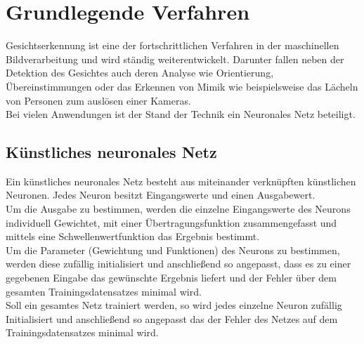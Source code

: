 \section{Grundlegende Verfahren}
Gesichtserkennung ist eine der fortschrittlichen Verfahren in der maschinellen Bildverarbeitung und wird ständig weiterentwickelt. Darunter fallen neben der Detektion des Gesichtes auch deren Analyse wie Orientierung, Übereinstimmungen oder das Erkennen von Mimik wie beispielsweise das Lächeln von Personen zum auslösen einer Kameras.\\
Bei vielen Anwendungen ist der Stand der Technik ein Neuronales Netz beteiligt.
\subsection{Künstliches neuronales Netz}
Ein künstliches neuronales Netz besteht aus miteinander verknüpften künstlichen Neuronen. Jedes Neuron besitzt Eingangswerte und einen Ausgabewert.\\
Um die Ausgabe zu bestimmen, werden die einzelne Eingangswerte des Neurons individuell Gewichtet, mit einer Übertragungsfunktion zusammengefasst und mittels eine Schwellenwertfunktion das Ergebnis bestimmt.\\
Um die Parameter (Gewichtung und Funktionen) des Neurons zu bestimmen, werden diese zufällig initialisiert und anschließend so angepasst, dass es zu einer gegebenen Eingabe das gewünschte Ergebnis liefert und der Fehler über dem gesamten Trainingsdatensatzes minimal wird.\\
Soll ein gesamtes Netz trainiert werden, so wird jedes einzelne Neuron zufällig Initialisiert und anschließend so angepasst das der Fehler des Netzes auf dem Trainingsdatensatzes minimal wird.\\
\cite{Maschin_Neuron}
